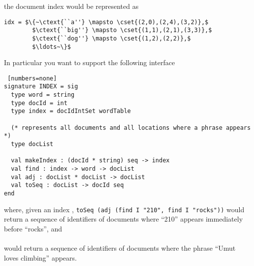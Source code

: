 \begin{cluster}
\label{grp:grm:practice-exam-ii::document}

\begin{gram}
\label{grm:practice-exam-ii::document}
the document index would be represented as
\begin{lstlisting}[numbers=none]
idx = $\{~\ctext{``a''} \mapsto \cset{(2,0),(2,4),(3,2)},$
        $\ctext{``big''} \mapsto \cset{(1,1),(2,1),(3,3)},$
        $\ctext{``dog''} \mapsto \cset{(1,2),(2,2)},$
        $\ldots~\}$
\end{lstlisting}

\end{gram}
\end{cluster}

\begin{cluster}
\label{grp:grm:practice-exam-ii::particular}

\begin{gram}
\label{grm:practice-exam-ii::particular}
In particular you want to support the following interface
\begin{lstlisting} [numbers=none]
signature INDEX = sig
  type word = string
  type docId = int
  type index = docIdIntSet wordTable
  
  (* represents all documents and all locations where a phrase appears *)
  type docList

  val makeIndex : (docId * string) seq -> index    
  val find : index -> word -> docList
  val adj : docList * docList -> docList
  val toSeq : docList -> docId seq 
end
\end{lstlisting}
where, given an index ,
\texttt{toSeq (adj (find I "210", find I "rocks"))} would return a sequence of
identifiers of documents
where ``210'' appears immediately before ``rocks'', and \\
\\
would return a sequence of identifiers of documents
where the phrase ``Umut loves climbing'' appears.

\end{gram}
\end{cluster}

